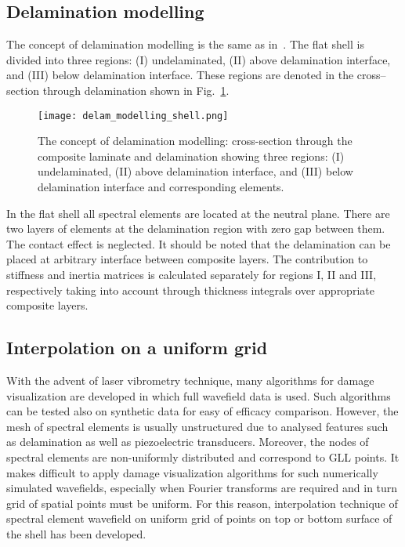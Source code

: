 \documentclass[preprint,12pt]{elsarticle}
\begin{document}
	\subsection{Delamination modelling \label{sec:delam_model}}
	The concept of delamination modelling is the same as in~\cite{Kudela2009}. The flat shell is divided into three regions: (I) undelaminated, (II) above delamination interface, and (III) below delamination interface. These regions are denoted in the cross--section through delamination shown in Fig.~\ref{fig:delam_modelling_shell}. 
	\begin{figure} [h!]
		\centering
		\texttt{[image: delam\_modelling\_shell.png]}	
		\caption{The concept of delamination modelling: cross-section through the composite laminate and delamination showing three regions: (I) undelaminated, (II) above delamination interface, and (III) below delamination interface and corresponding elements.}
		\label{fig:delam_modelling_shell}
	\end{figure}
	In the flat shell all spectral elements are located at the neutral plane. There are two layers of elements at the delamination region with zero gap between them. The contact effect is neglected. It should be noted that the delamination can be placed at arbitrary interface between composite layers. The contribution to stiffness and inertia matrices is calculated separately for regions I, II and III, respectively taking into account through thickness integrals over appropriate composite layers.
	\subsection{Interpolation on a uniform grid}
	With the advent of laser vibrometry technique, many algorithms for damage visualization  are developed in which full wavefield data is used. Such algorithms can be tested also on synthetic data for easy of efficacy comparison. However, the mesh of spectral elements is usually unstructured due to analysed features such as delamination as well as piezoelectric transducers. Moreover, the nodes of spectral elements are non-uniformly distributed and correspond to GLL points. It makes difficult to apply damage visualization algorithms for such numerically simulated wavefields, especially when Fourier transforms are required and in turn grid of spatial points must be uniform. For this reason, interpolation technique of spectral element wavefield on uniform grid of points on top or bottom surface of the shell has been developed. 
	
\end{document}
